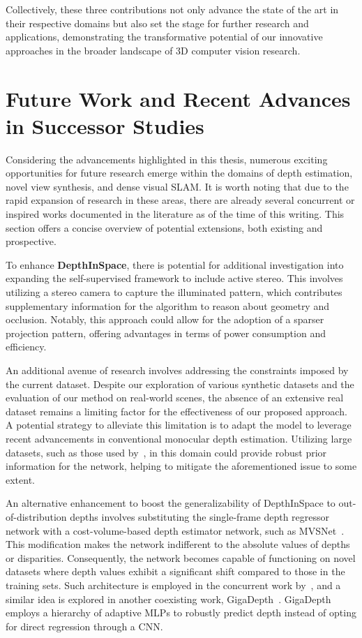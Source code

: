  Collectively, these three contributions not only advance the state of the art in their respective domains but also set the stage for further research and applications, demonstrating the transformative potential of our innovative approaches in the broader landscape of 3D computer vision research.

\section{Future Work and Recent Advances in Successor Studies}

Considering the advancements highlighted in this thesis, numerous exciting opportunities for future research emerge within the domains of depth estimation, novel view synthesis, and dense visual SLAM. It is worth noting that due to the rapid expansion of research in these areas, there are already several concurrent or inspired works documented in the literature as of the time of this writing. This section offers a concise overview of potential extensions, both existing and prospective.


To enhance \textbf{DepthInSpace}, there is potential for additional investigation into expanding the self-supervised framework to include active stereo. This involves utilizing a stereo camera to capture the illuminated pattern, which contributes supplementary information for the algorithm to reason about geometry and occlusion. Notably, this approach could allow for the adoption of a sparser projection pattern, offering advantages in terms of power consumption and efficiency.

An additional avenue of research involves addressing the constraints imposed by the current dataset. Despite our exploration of various synthetic datasets and the evaluation of our method on real-world scenes, the absence of an extensive real dataset remains a limiting factor for the effectiveness of our proposed approach. A potential strategy to alleviate this limitation is to adapt the model to leverage recent advancements in conventional monocular depth estimation. Utilizing large datasets, such as those used by~\cite{ranftl2020towards}, in this domain could provide robust prior information for the network, helping to mitigate the aforementioned issue to some extent.

An alternative enhancement to boost the generalizability of DepthInSpace to out-of-distribution depths involves substituting the single-frame depth regressor network with a cost-volume-based depth estimator network, such as MVSNet~\citep{yao2018mvsnet}. This modification makes the network indifferent to the absolute values of depths or disparities. Consequently, the network becomes capable of functioning on novel datasets where depth values exhibit a significant shift compared to those in the training sets. Such architecture is employed in the concurrent work by~\cite{li2023self}, and a similar idea is explored in another coexisting work, GigaDepth~\citep{schreiberhuber2022gigadepth}. GigaDepth employs a hierarchy of adaptive MLPs to robustly predict depth instead of opting for direct regression through a CNN.

